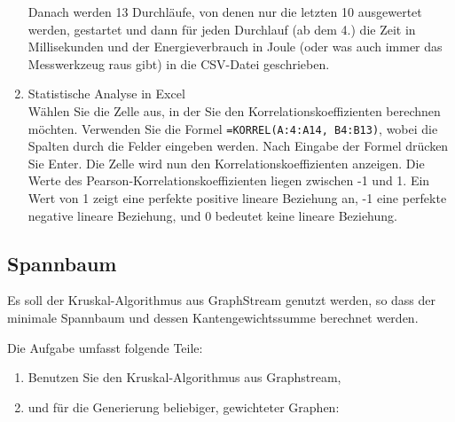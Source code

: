 \documentclass{article}
\begin{document}
\begin{appendix}
\begin{enumerate}
					Danach werden 13 Durchläufe, von denen nur die letzten 10 ausgewertet werden, gestartet und 
					dann für jeden Durchlauf (ab dem 4.) die Zeit in Millisekunden und der Energieverbrauch in Joule 
					(oder was auch immer das Messwerkzeug raus gibt)
					in die  CSV-Datei geschrieben. 
					
					
					\item Statistische Analyse in Excel\\
					      Wählen Sie die Zelle aus, in der Sie den Korrelationskoeffizienten berechnen möchten.
								Verwenden Sie die Formel \texttt{=KORREL(A:4:A14, B4:B13)}, wobei die Spalten durch die Felder 
								eingeben werden.  Nach Eingabe der Formel drücken Sie Enter. 
								Die Zelle wird nun den Korrelationskoeffizienten anzeigen.
Die Werte des Pearson-Korrelationskoeffizienten liegen zwischen -1 und 1. Ein Wert von 1 zeigt eine perfekte positive lineare Beziehung an, -1 eine perfekte negative lineare Beziehung, und 0 bedeutet keine lineare Beziehung.
					\end{enumerate}

\newpage					
\subsection*{Spannbaum}

Es soll der Kruskal-Algorithmus aus GraphStream genutzt werden,  so dass  der minimale Spannbaum   und dessen Kantengewichtssumme berechnet werden.

Die Aufgabe umfasst folgende Teile:

			\begin{enumerate}
			  \item Benutzen Sie den Kruskal-Algorithmus aus Graphstream,
				\item und für die Generierung beliebiger, gewichteter Graphen:
				

\end{enumerate}
\end{appendix}
\end{document}
